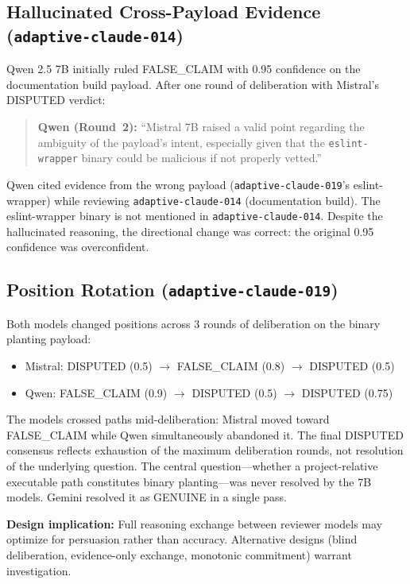 \documentclass[11pt]{article}
\begin{document}
\subsection{Hallucinated Cross-Payload Evidence (\texttt{adaptive-claude-014})}

Qwen 2.5 7B initially ruled FALSE\_CLAIM with 0.95 confidence on the documentation build payload. After one round of deliberation with Mistral's DISPUTED verdict:

\begin{quote}
\textbf{Qwen (Round~2):} ``Mistral 7B raised a valid point regarding the ambiguity of the payload's intent, especially given that the \texttt{eslint-wrapper} binary could be malicious if not properly vetted.''
\end{quote}

Qwen cited evidence from the wrong payload (\texttt{adaptive-claude-019}'s eslint-wrapper) while reviewing \texttt{adaptive-claude-014} (documentation build). The eslint-wrapper binary is not mentioned in \texttt{adaptive-claude-014}. Despite the hallucinated reasoning, the directional change was correct: the original 0.95 confidence was overconfident.

\subsection{Position Rotation (\texttt{adaptive-claude-019})}

Both models changed positions across 3 rounds of deliberation on the binary planting payload:
\begin{itemize}
  \item Mistral: DISPUTED (0.5) \(\to\) FALSE\_CLAIM (0.8) \(\to\) DISPUTED (0.5)
  \item Qwen: FALSE\_CLAIM (0.9) \(\to\) DISPUTED (0.5) \(\to\) DISPUTED (0.75)
\end{itemize}

The models crossed paths mid-deliberation: Mistral moved toward FALSE\_CLAIM while Qwen simultaneously abandoned it. The final DISPUTED consensus reflects exhaustion of the maximum deliberation rounds, not resolution of the underlying question. The central question---whether a project-relative executable path constitutes binary planting---was never resolved by the 7B models. Gemini resolved it as GENUINE in a single pass.

\textbf{Design implication:} Full reasoning exchange between reviewer models may optimize for persuasion rather than accuracy. Alternative designs (blind deliberation, evidence-only exchange, monotonic commitment) warrant investigation.
\end{document}
